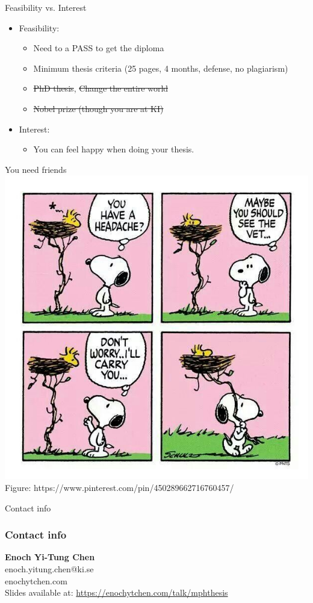\documentclass{beamer}
\begin{document}
\begin{frame}{Feasibility vs. Interest}
	\begin{itemize}
	\item Feasibility: 
	      \begin{itemize}
	      \item<1-> Need to a PASS to get the diploma
	      \item<2-> Minimum	 thesis criteria (25 pages, 4 months, defense, no plagiarism)
	      \item<3-> \st{PhD thesis}, \st{Change the entire world}
	      \item<4-> \st{Nobel prize (though you are at KI)}
	      \end{itemize}
	\item<1->  Interest:
		 \begin{itemize}
		 \item<5-> You can feel happy when doing your thesis.

		 \end{itemize}
		\end{itemize}
\end{frame}

\begin{frame}{You need friends}
	\center
	\includegraphics[scale=0.3]{image/snoopy}\\
	\small{Figure: https://www.pinterest.com/pin/450289662716760457/}
\end{frame}



\begin{frame}{Contact info}

\frametitle{Contact info}
\textbf{Enoch Yi-Tung Chen}\\

enoch.yitung.chen@ki.se\\
enochytchen.com\\

Slides available at: \url{https://enochytchen.com/talk/mphthesis}

\end{frame}
\end{document}
